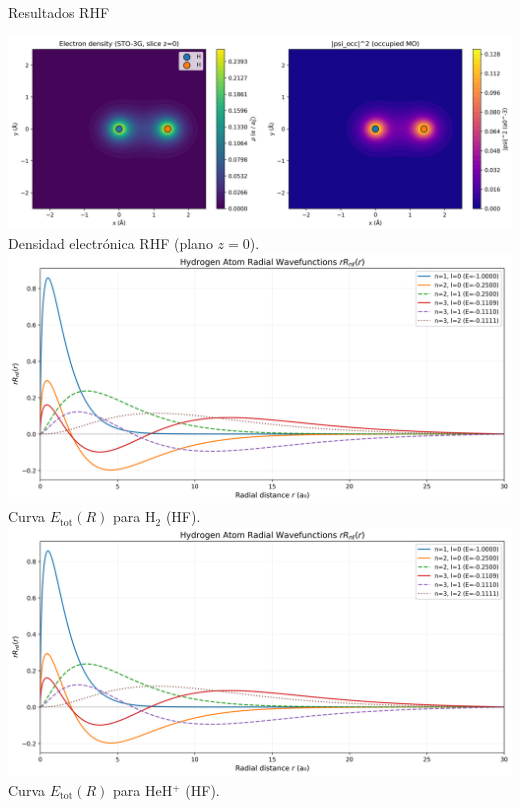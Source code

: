\documentclass[final]{beamer}
\begin{document}
\begin{frame}[t]
\begin{columns}[t,totalwidth=\textwidth]
\begin{column}{0.36\textwidth}
\begin{block}{Resultados RHF}
\begin{center}
\includegraphics[width=0.95\linewidth]{density.png}\\[-0.2em]
{\small Densidad electrónica RHF (plano $z=0$).}\\[0.6em]
\includegraphics[width=0.95\linewidth]{hydrogen.png}\\[-0.2em]
{\small Curva $E_{\mathrm{tot}}(R)$ para H$_2$ (HF).}\\[0.6em]
\includegraphics[width=0.95\linewidth]{hydrogen.png}\\[-0.2em]
{\small Curva $E_{\mathrm{tot}}(R)$ para HeH$^+$ (HF).}
\end{center}
\end{block}

\end{column}


\end{columns}
\end{frame}
\end{document}
